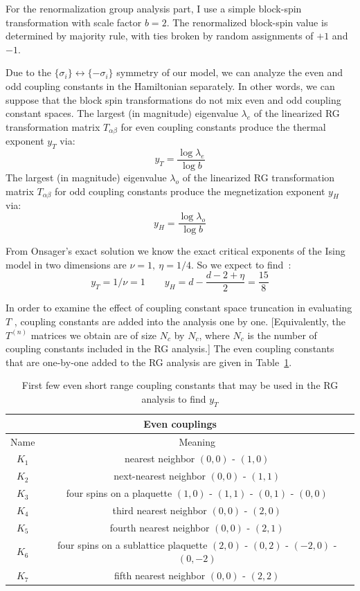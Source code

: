 \documentclass[12pt]{article}
\begin{document}
For the renormalization group analysis part, I use a simple block-spin transformation with scale factor $b = 2$. The renormalized block-spin value is determined by majority rule, with ties broken by random assignments of $+1$ and $-1$.  


Due to the $\{\sigma_i\} \leftrightarrow \{-\sigma_i\}$ symmetry of our model, we can analyze the even and odd coupling constants in the Hamiltonian separately. In other words, we can suppose that the block spin transformations do not mix even and odd coupling constant spaces. The largest (in magnitude) eigenvalue $\lambda_e$ of the linearized RG transformation matrix $T_{\alpha\beta}$ for even coupling constants produce the thermal exponent $y_T$ via:
\begin{equation}
y_T = \frac{\log \lambda_e}{\log b}
\end{equation}
The largest (in magnitude) eigenvalue $\lambda_o$ of the linearized RG transformation matrix $T_{\alpha\beta}$ for odd coupling constants  produce the megnetization exponent $y_H$ via:
\begin{equation}
y_H = \frac{\log \lambda_o}{\log b}
\end{equation}

From Onsager's exact solution \cite{Onsager1944} we know the exact critical exponents of the Ising model in two dimensions are $\nu = 1 ,\  \eta = 1/4$. So we expect to find~\cite{Goldenfeld1992}:
\begin{equation*}
y_T = 1/\nu = 1 \qquad y_H = d-\frac{d-2+\eta}{2}= \frac{15}{8}
\end{equation*}

In order to examine the effect of coupling constant space truncation in evaluating $T$ , coupling constants are added into the analysis one by one. [Equivalently, the $T^{(n)}$ matrices we obtain are of size $N_c$ by $N_c$, where $N_c$ is the number of coupling constants included in the RG analysis.] The even coupling constants that are one-by-one added to the RG analysis are given in Table~\ref{even}. 

\begin{table}[H]
\centering
\begin{tabular}{|c |c|} 
 \hline
\multicolumn{2}{|c|}{Even couplings} \\ 
 \hline
 Name & Meaning\\
 \hline
 $K_1$ & nearest neighbor $(0,0)$ - $(1,0)$\\
 $K_2$ & next-nearest neighbor $(0,0)$ - $(1,1)$\\
 $K_3$ & four spins on a plaquette $(1,0)$ - $(1,1)$ - $(0,1)$ - $(0,0)$\\
 $K_4$ & third nearest neighbor $(0,0)$ - $(2,0)$\\
 $K_5$ & fourth nearest neighbor $(0,0)$ - $(2,1)$\\
 $K_6$ & four spins on a sublattice plaquette $(2,0)$ - $(0,2)$ - $(-2,0)$ - $(0,-2)$\\
 $K_7$ & fifth nearest neighbor $(0,0)$ - $(2,2)$\\
 \hline
 \end{tabular}
 \caption{\label{even}First few even short range coupling constants that may be used in the RG analysis to find $y_T$}
\end{table}
\end{document}
